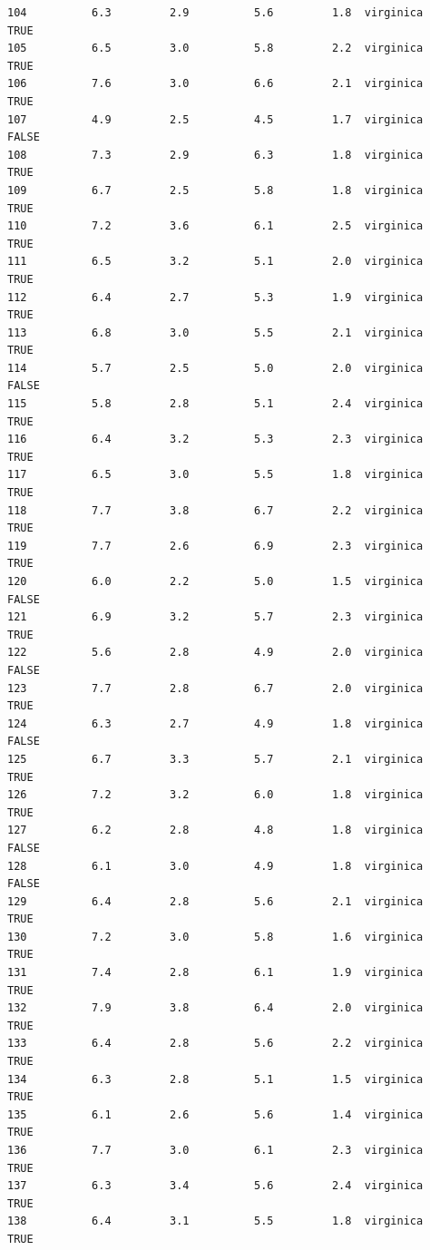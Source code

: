 \documentclass[
  letterpaper,
  DIV=11,
  numbers=noendperiod]{scrreprt}
\begin{document}
\begin{verbatim}
104          6.3         2.9          5.6         1.8  virginica      TRUE
105          6.5         3.0          5.8         2.2  virginica      TRUE
106          7.6         3.0          6.6         2.1  virginica      TRUE
107          4.9         2.5          4.5         1.7  virginica     FALSE
108          7.3         2.9          6.3         1.8  virginica      TRUE
109          6.7         2.5          5.8         1.8  virginica      TRUE
110          7.2         3.6          6.1         2.5  virginica      TRUE
111          6.5         3.2          5.1         2.0  virginica      TRUE
112          6.4         2.7          5.3         1.9  virginica      TRUE
113          6.8         3.0          5.5         2.1  virginica      TRUE
114          5.7         2.5          5.0         2.0  virginica     FALSE
115          5.8         2.8          5.1         2.4  virginica      TRUE
116          6.4         3.2          5.3         2.3  virginica      TRUE
117          6.5         3.0          5.5         1.8  virginica      TRUE
118          7.7         3.8          6.7         2.2  virginica      TRUE
119          7.7         2.6          6.9         2.3  virginica      TRUE
120          6.0         2.2          5.0         1.5  virginica     FALSE
121          6.9         3.2          5.7         2.3  virginica      TRUE
122          5.6         2.8          4.9         2.0  virginica     FALSE
123          7.7         2.8          6.7         2.0  virginica      TRUE
124          6.3         2.7          4.9         1.8  virginica     FALSE
125          6.7         3.3          5.7         2.1  virginica      TRUE
126          7.2         3.2          6.0         1.8  virginica      TRUE
127          6.2         2.8          4.8         1.8  virginica     FALSE
128          6.1         3.0          4.9         1.8  virginica     FALSE
129          6.4         2.8          5.6         2.1  virginica      TRUE
130          7.2         3.0          5.8         1.6  virginica      TRUE
131          7.4         2.8          6.1         1.9  virginica      TRUE
132          7.9         3.8          6.4         2.0  virginica      TRUE
133          6.4         2.8          5.6         2.2  virginica      TRUE
134          6.3         2.8          5.1         1.5  virginica      TRUE
135          6.1         2.6          5.6         1.4  virginica      TRUE
136          7.7         3.0          6.1         2.3  virginica      TRUE
137          6.3         3.4          5.6         2.4  virginica      TRUE
138          6.4         3.1          5.5         1.8  virginica      TRUE

\end{verbatim}
\end{document}
